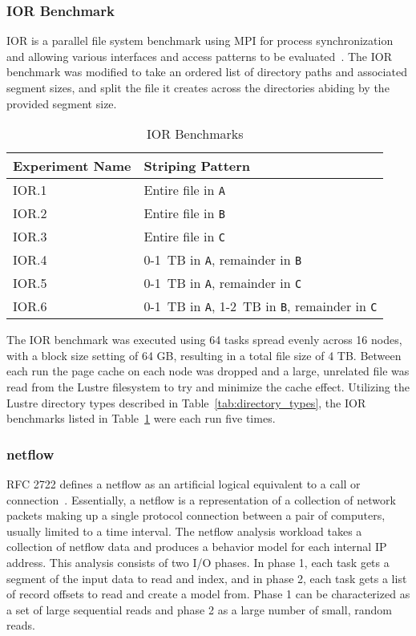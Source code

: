 \documentclass[conference,compsoc]{IEEEtran}
\begin{document}
\subsubsection{IOR Benchmark}

IOR is a parallel file system benchmark using MPI for process synchronization and allowing various interfaces and access patterns to be evaluated~\cite{ior}. The IOR benchmark was modified to take an ordered list of directory paths and associated segment sizes, and split the file it creates across the directories abiding by the provided segment size. 

\begin{table}[h]
\centering
\caption{IOR Benchmarks}
\label{tab:ior_benchmarks}
\begin{tabular}{ll}
Experiment Name & Striping Pattern \\
\hline
IOR.1 & Entire file in \texttt{A} \\
IOR.2 & Entire file in \texttt{B} \\
IOR.3 & Entire file in \texttt{C} \\
IOR.4 & 0-1~TB in \texttt{A}, remainder in \texttt{B} \\
IOR.5 & 0-1~TB in \texttt{A}, remainder in \texttt{C} \\
IOR.6 & 0-1~TB in \texttt{A}, 1-2~TB in \texttt{B}, remainder in \texttt{C} \\
\end{tabular}
\end{table}

The IOR benchmark was executed using 64 tasks spread evenly across 16 nodes, with a block size setting of 64 GB, resulting in a total file size of 4 TB. Between each run the page cache on each node was dropped and a large, unrelated file was read from the Lustre filesystem to try and minimize the cache effect. Utilizing the Lustre directory types described in Table~\ref{tab:directory_types}, the IOR benchmarks listed in Table~\ref{tab:ior_benchmarks} were each run five times.

\subsubsection{netflow}

RFC 2722 defines a netflow as an artificial logical equivalent to a call or connection~\cite{rfc2722}. Essentially, a netflow is a representation of a collection of network packets making up a single protocol connection between a pair of computers, usually limited to a time interval.
The netflow analysis workload takes a collection of netflow data and produces a behavior model for each internal IP address. This analysis consists of two I/O phases. In phase 1, each task gets a segment of the input data to read and index, and in phase 2, each task gets a list of record offsets to read and create a model from. Phase 1 can be characterized as a set of large sequential reads and phase 2 as a large number of small, random reads. 
\end{document}
